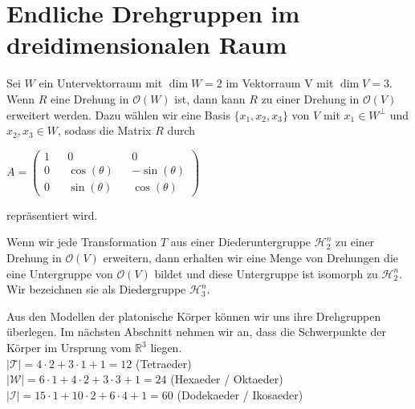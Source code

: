 \section{Endliche Drehgruppen im dreidimensionalen Raum}
\begin{bem}
 Sei $W$ ein Untervektorraum mit $\dim W = 2$ im Vektorraum V mit $\dim V = 3$. Wenn $R$ eine Drehung in $\mathcal{O}(W)$ ist, dann kann $R$ zu einer Drehung in $\mathcal{O}(V)$ erweitert werden. Dazu wählen wir eine Basis $\{x_1,x_2,x_3\}$ von $V$ mit $x_1 \in W^{\perp}$ und $x_2,x_3 \in W$, sodass die Matrix $R$ durch \begin{center}
                                                                                                                                                                                                                                                                                                                                 $A=\begin{pmatrix}                                                                                                                                                                                                                                                                                                                                     
   1 && 0 && 0 \\
   0 && \cos(\theta) && -\sin(\theta) \\
   0 && \sin(\theta) && \cos(\theta)
   \end{pmatrix}
$                                                                                                                                                                                                                                                                                                                         \end{center}
repräsentiert wird.
\end{bem}
\begin{bem}
 Wenn wir jede Transformation $T$ aus einer Diederuntergruppe $\mathcal{H}^n_2$ zu einer Drehung in $\mathcal{O}(V)$ erweitern, dann erhalten wir eine Menge von Drehungen die eine Untergruppe von $\mathcal{O}(V)$ bildet und diese Untergruppe ist isomorph zu $\mathcal{H}^n_2$. Wir bezeichnen sie als Diedergruppe $\mathcal{H}^n_3$.
\end{bem}
\begin{bem}Aus den Modellen der platonische Körper können wir uns ihre Drehgruppen überlegen. Im nächsten Abschnitt nehmen wir an, dass die Schwerpunkte der Körper im Ursprung vom $\mathbb{R}^3$ liegen. \\
$|\mathcal{T}|=4 \cdot 2 + 3 \cdot 1 +1 = 12$ (Tetraeder)\\
$|\mathcal{W}|=6 \cdot 1 + 4 \cdot 2 + 3 \cdot 3 +1 = 24$ (Hexaeder / Oktaeder)\\
$|\mathcal{I}|=15 \cdot 1 + 10 \cdot 2 + 6 \cdot 4 +1 = 60$ (Dodekaeder / Ikosaeder)
\end{bem}

